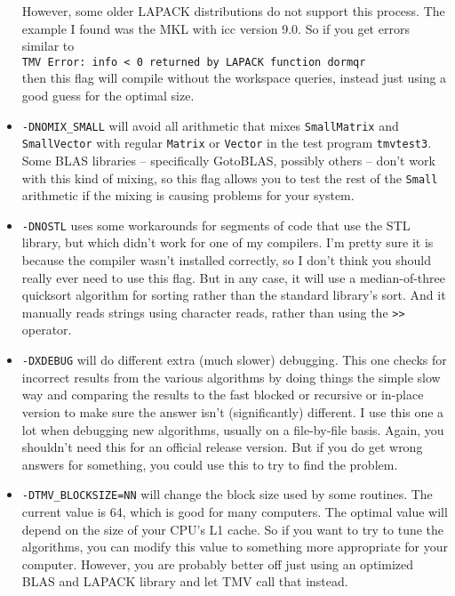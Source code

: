 \documentclass[twoside,letterpaper,11pt]{article}
\renewcommand{\tt}[1]{{\lstinline {#1}}}
\begin{document}
\begin{itemize}
However, some older LAPACK distributions do not support
this process.  The example I found was the MKL with icc version 9.0.
So if you get errors similar to \\
\texttt{TMV Error: info < 0 returned by LAPACK function dormqr}\\
then this flag will compile without the workspace queries, instead just
using a good guess for the optimal size.

\item
\texttt{-DNOMIX\_SMALL} will avoid all arithmetic that mixes \tt{SmallMatrix} and \tt{SmallVector} 
with regular \tt{Matrix} or \tt{Vector} in the test program \texttt{tmvtest3}.
Some BLAS libraries -- specifically GotoBLAS, possibly others -- 
don't work with this kind of mixing, so this flag allows you to test
the rest of the \tt{Small} arithmetic if the mixing is causing problems for your
system.  

\item
\texttt{-DNOSTL} uses some workarounds for segments of code that use the STL
library, but which didn't work for one of my compilers.  I'm pretty sure it is
because the compiler wasn't installed correctly, so I don't think you
should really ever need to use this flag.  
But in any case, it 
will use a median-of-three quicksort algorithm for sorting
rather than the standard library's sort.  And it manually reads strings 
using character reads, rather than using the \tt{>>} operator.  

\item
\texttt{-DXDEBUG} will do different extra (much slower) debugging.  This one checks for
incorrect results from the various algorithms by doing things the simple slow way
and comparing the results to the fast blocked or recursive or in-place version
to make sure the answer isn't (significantly) different.  
I use this one a lot when debugging
new algorithms, usually on a file-by-file basis.  Again, you shouldn't need this for
an official release version.  But if you do get wrong answers for something, you could
use this to try to find the problem.

\item
\texttt{-DTMV\_BLOCKSIZE=NN} will change the block size used by some routines.  
The current value is 64, which is good for many computers.  
The optimal value will depend on the size of your
CPU's L1 cache.  So if you want to try to tune the algorithms, you can 
modify this value to something more appropriate for your computer.
However, you are probably better off just using an optimized BLAS and LAPACK
library and let TMV call that instead.
\end{itemize}
\end{document}
